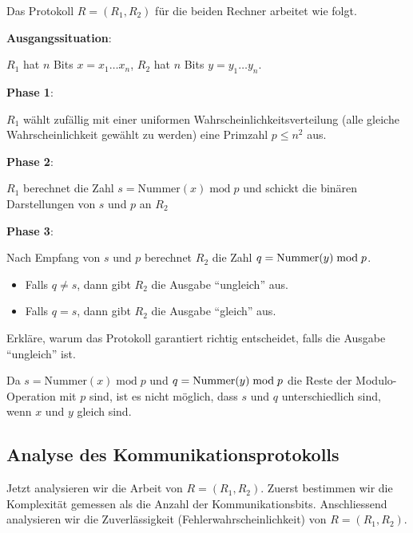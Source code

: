 	Das Protokoll $R = (R_1,R_2)$ für die beiden Rechner arbeitet wie folgt.
	\begin{mdframed}[backgroundcolor=green!20,roundcorner=10pt,userdefinedwidth=16cm,align=center]
		\textbf{Ausgangssituation}:

		$R_1$ hat $n$ Bits $x=x_1\ldots x_n$, $R_2$ hat $n$ Bits $y = y_1\ldots y_n$.

		\textbf{Phase 1}:

		$R_1$ wählt zufällig mit einer uniformen Wahrscheinlichkeitsverteilung (alle gleiche Wahrscheinlichkeit gewählt zu werden) eine Primzahl $p \leq n^2$ aus.


		\textbf{Phase 2}:

		$R_1$ berechnet die Zahl $s = \text{Nummer}(x)\; \text{mod} \; p$ und schickt die binären Darstellungen von $s$ und $p$ an $R_2$


		\textbf{Phase 3}:

		Nach Empfang von $s$ und $p$ berechnet $R_2$ die Zahl $q = \text{Nummer}(y)\; \text{\text{mod}} \; p$.
		\begin{itemize}
			\item Falls $q\neq s$, dann gibt $R_2$ die Ausgabe \enquote{ungleich} aus.
			\item Falls $q = s$, dann gibt $R_2$ die Ausgabe \enquote{gleich} aus.
		\end{itemize}
	\end{mdframed}


	\begin{myexercise}
		Erkläre, warum das Protokoll garantiert richtig entscheidet, falls die Ausgabe \enquote{ungleich} ist.
		\begin{myanswer}
			Da $s = \text{Nummer}(x)\; \text{mod} \; p$ und $q = \text{Nummer}(y)\; \text{\text{mod}} \; p$ die Reste der Modulo-Operation mit $p$ sind, ist es nicht möglich, dass $s$ und $q$ unterschiedlich sind, wenn $x$ und $y$ gleich sind.
		\end{myanswer}
	\end{myexercise}


	\subsection{Analyse des Kommunikationsprotokolls}
	Jetzt analysieren wir die Arbeit von $R = (R_1,R_2)$. Zuerst bestimmen wir die Komplexität gemessen als die Anzahl der Kommunikationsbits. Anschliessend analysieren wir die Zuverlässigkeit (Fehlerwahrscheinlichkeit) von $R = (R_1, R_2)$.


